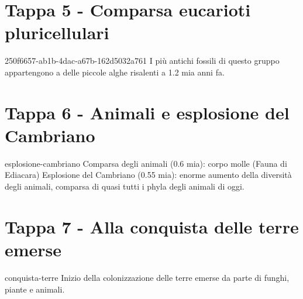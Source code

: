 \documentclass[preview]{standalone}
\begin{document}
\section{Tappa 5 - Comparsa eucarioti pluricellulari}

\begin{snippet}{250f6657-ab1b-4dac-a67b-162d5032a761}
    I più antichi fossili di questo gruppo appartengono a delle
    piccole alghe risalenti a 1.2 mia anni fa.
\end{snippet}

\section{Tappa 6 - Animali e esplosione del Cambriano}

\begin{snippet}{esplosione-cambriano}
    Comparsa degli animali (0.6 mia): corpo molle (Fauna di Ediacara)
    Esplosione del Cambriano (0.55 mia): enorme aumento della diversità
    degli animali, comparsa di quasi tutti i phyla degli animali di oggi.
\end{snippet}

\section{Tappa 7 - Alla conquista delle terre emerse}

\begin{snippet}{conquista-terre}
    Inizio della colonizzazione delle terre emerse da parte
    di funghi, piante e animali.
\end{snippet}
\end{document}
